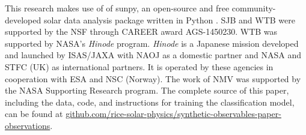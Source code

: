 \documentclass[modern]{aastex63}
\begin{document}
\acknowledgments
This research makes use of  of sunpy, an open-source and free community-developed solar data analysis package written in Python \citep{the_sunpy_community_sunpy_2020}.
SJB and WTB were supported by the NSF through CAREER award AGS-1450230.
WTB was supported by NASA’s \textit{Hinode} program.
\textit{Hinode} is a Japanese mission developed and launched by ISAS/JAXA with NAOJ as a domestic partner and NASA and STFC (UK) as international partners.
It is operated by these agencies in cooperation with ESA and NSC (Norway).
The work of NMV was supported by the NASA Supporting Research program.
The complete source of this paper, including the data, code, and instructions for training the classification model, can be found at \href{https://github.com/rice-solar-physics/synthetic-observables-paper-observations}{github.com/rice-solar-physics/synthetic-observables-paper-observations}.






\listofchanges
\end{document}
